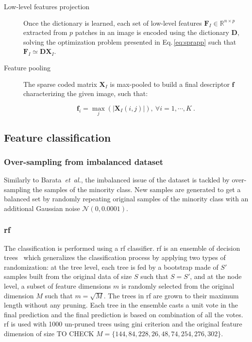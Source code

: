 \begin{description}
\item[Low-level features projection] Once the dictionary is learned, each set of low-level features $\mathbf{F}_{I} \in \mathbb{R}^{n \times p}$ extracted from $p$ patches in an image is encoded using the dictionary $\mathbf{D}$, solving the optimization problem presented in Eq.\,\ref{eq:sprapp} such that $\mathbf{F}_{I} \simeq \mathbf{DX}_{I}$.

\item[Feature pooling] The sparse coded matrix $\mathbf{X}_{I}$ is max-pooled to build a final descriptor $\mathbf{f}$ characterizing the given image, such that:

\begin{equation}
  \mathbf{f}_i = \max_{j}\left(|\mathbf{X}_{I}(i,j)|\right), \ \forall i = 1, \cdots, K\ .
\end{equation}


\end{description}

\subsection{Feature classification}

\subsubsection{Over-sampling from imbalanced dataset}

Similarly to Barata~\emph{et~al.}\cite{barata2013two}, the imbalanced issue of the dataset is tackled by over-sampling the samples of the minority class.
New samples are generated to get a balanced set by randomly repeating original samples of the minority class with an additional Gaussian noise $\mathcal{N}(0, 0.0001)$.

\subsubsection{\acf*{rf}}

The classification is performed using a \ac{rf} classifier.
\Ac{rf} is an ensemble of decision trees~\cite{breiman2001random} which generalizes the classification process by applying two types of randomization: at the tree level, each tree is fed by a bootstrap made of $S'$ samples built from the original data of size $S$ such that  $S=S'$, and at the node level, a subset of feature dimensions $m$ is randomly selected from the original dimension $M$ such that $m=\sqrt{M}$. 
The trees in \ac{rf} are grown to their maximum length without any pruning.
Each tree in the ensemble casts a unit vote in the final prediction and the final prediction is based on combination of all the votes. 
\Ac{rf} is used with 1000 un-pruned trees using gini criterion and the original feature dimension of size {\color{red} TO CHECK $M=\{144,84,228,26,48,74,254,276,302\}$}.

